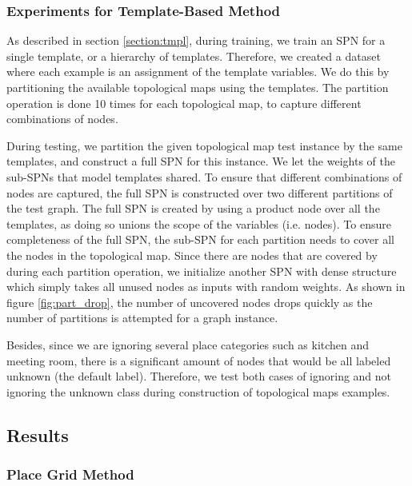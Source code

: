 \documentclass[10pt, titlepage]{article}
\theoremstyle{definition}
\begin{document}
\subsubsection{Experiments for Template-Based Method}\label{section:exp-tmpl}

As described in section \ref{section:tmpl}, during training, we train an SPN for a single template, or a hierarchy of templates. Therefore, we created a dataset where each example is an assignment of the template variables. We do this by partitioning the available topological maps using the templates. The partition operation is done 10 times for each topological map, to capture different combinations of nodes.

During testing, we partition the given topological map test instance by the same templates, and construct a full SPN for this instance. We let the weights of the sub-SPNs that model templates shared.  To ensure that different combinations of nodes are captured, the full SPN is constructed over two different partitions of the test graph. The full SPN is created by using a product node over all the templates, as doing so unions the scope of the variables (i.e. nodes). To ensure completeness of the full SPN, the sub-SPN for each partition needs to cover all the nodes in the topological map. Since there are nodes that are covered by during each partition operation, we initialize another SPN with dense structure which simply takes all unused nodes as inputs with random weights. As shown in figure \ref{fig:part_drop}, the number of uncovered nodes drops quickly as the number of partitions is attempted for a graph instance.

Besides, since we are ignoring several place categories such as kitchen and meeting room, there is a significant amount of nodes that would be all labeled unknown (the default label). Therefore, we test both cases of ignoring and not ignoring the unknown class during construction of topological maps examples.

\subsection{Results}\label{section:results}

\subsubsection{Place Grid Method}
\end{document}
